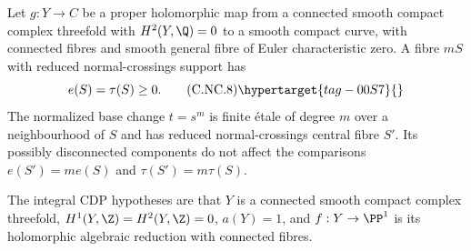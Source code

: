\begin{proposition}\hypertarget{tag-01CA}{}\label{cdp:st:C.2.NC.3}


Let $g:Y\to C$ be a proper holomorphic map from a connected smooth compact complex threefold with $H^2(Y,\Q)=0$ to a smooth compact curve, with connected fibres and smooth general fibre of Euler characteristic zero. A fibre $mS$ with reduced normal-crossings support has
\[
 e(S)=\tau(S)\ge0.
 \tag{C.NC.8}\hypertarget{tag-00S7}{}\label{cdp:eq:C.NC.8}
\]
The normalized base change $t=s^m$ is finite étale of degree $m$ over a neighbourhood of $S$ and has reduced normal-crossings central fibre $S'$. Its possibly disconnected components do not affect the comparisons
$e(S')=m e(S)$ and $\tau(S')=m\tau(S)$.
\end{proposition}

\begin{definition}
\hypertarget{tag-P201}{}\label{def:II:integral-cdp}

The integral CDP hypotheses are that $Y$ is a connected
smooth compact complex threefold, $H^1(Y,\Z)=H^2(Y,\Z)=0$,
$a(Y)=1$, and $f:Y\to\PP^1$ is its holomorphic algebraic reduction
with connected fibres.
\end{definition}
